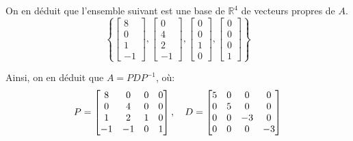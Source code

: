 \documentclass[a4paper]{article}
\begin{document}
{    On en déduit que l'ensemble suivant est une base de $\mathbb{R}^4$ de vecteurs propres de $A$.
    \[\left\{\begin{bmatrix} 8 \\ 0 \\ 1 \\ -1 \end{bmatrix}, \begin{bmatrix} 0 \\ 4 \\ 2 \\ -1 \end{bmatrix}, \begin{bmatrix} 0 \\ 0 \\ 1 \\ 0 \end{bmatrix}, \begin{bmatrix} 0 \\ 0 \\ 0 \\ 1 \end{bmatrix} \right\}\]
    
    Ainsi, on en déduit que $A = PDP^{-1}$, où:
    \[P = \begin{bmatrix} 8 & 0 & 0 & 0 \\ 0 & 4 & 0 & 0 \\ 1 & 2 & 1 & 0 \\ -1 & -1 & 0 & 1 \end{bmatrix}, \quad D = \begin{bmatrix} 5 & 0 & 0 & 0 \\ 0 & 5 & 0 & 0 \\ 0 & 0 & -3 & 0 \\ 0 & 0 & 0 & -3 \end{bmatrix} \]
}
\end{document}
